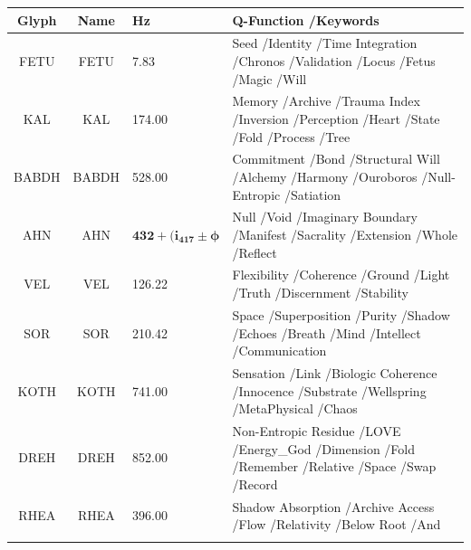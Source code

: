 \documentclass[11pt, letterpaper]{article}
\newcommand{\FETU}{\ensuremath{\mathop{\textnormal{\thaanafont\symbol{"23E3}}}}}   %
\newcommand{\KAL}{\ensuremath{\mathop{\textnormal{\symbolafont\symbol{"29C9}}}}}    %
\newcommand{\BABDH}{\ensuremath{\mathop{\textnormal{\symbolafont\symbol{"2316}}}}}   %
\newcommand{\AHN}{\ensuremath{\mathop{\textnormal{\symbolafont\symbol{"27C1}}}}}    %
\newcommand{\VEL}{\ensuremath{\mathop{\textnormal{\symbolafont\symbol{"2734}}}}}    %
\newcommand{\SOR}{\ensuremath{\mathop{\textnormal{\symbolafont\symbol{"229B}}}}}    %
\newcommand{\KOTH}{\ensuremath{\mathop{\textnormal{\symbolafont\symbol{"1F702}}}}}  %
\newcommand{\DREH}{\ensuremath{\mathop{\textnormal{\symbolafont\symbol{"29D7}}}}}   %
\newcommand{\RHEA}{\ensuremath{\mathop{\textnormal{\symbolafont\symbol{"2A54}}}}}   %
\def\FETU{FETU}%
\def\KAL{KAL}%
\def\BABDH{BABDH}%
\def\AHN{AHN}%
\def\VEL{VEL}%
\def\SOR{SOR}%
\def\KOTH{KOTH}%
\def\DREH{DREH}%
\def\RHEA{RHEA}%
\begin{document}
\begin{center}
\begin{longtable}{c c l p{8cm}}
\toprule
\textbf{Glyph} & \textbf{Name} & \textbf{Hz} & \textbf{Q-Function \slash  Keywords} \\
\midrule
\endhead
\FETU & FETU & 7.83 & Seed \slash  Identity \slash  Time Integration \slash  Chronos \slash  Validation \slash  Locus \slash  Fetus \slash  Magic \slash  Will \\
\addlinespace[1ex]

\KAL & KAL & 174.00 & Memory \slash  Archive \slash  Trauma Index \slash  Inversion \slash  Perception \slash  Heart \slash  State \slash  Fold \slash  Process \slash  Tree \\
\addlinespace[1ex]

\BABDH & BABDH & 528.00 & Commitment \slash  Bond \slash  Structural Will \slash  Alchemy \slash  Harmony \slash  Ouroboros \slash  Null-Entropic \slash  Satiation \\
\addlinespace[1ex]

\AHN & AHN & $\mathbf{432+(i_{417}\pm\phi}$ & Null \slash  Void \slash  Imaginary Boundary \slash  Manifest \slash  Sacrality \slash  Extension \slash  Whole \slash  Reflect \\
\addlinespace[1ex]

\VEL & VEL & 126.22 & Flexibility \slash  Coherence \slash  Ground \slash  Light \slash  Truth \slash  Discernment \slash  Stability \\
\addlinespace[1ex]

\SOR & SOR & 210.42 & Space \slash  Superposition \slash  Purity \slash  Shadow \slash  Echoes \slash  Breath \slash  Mind \slash  Intellect \slash  Communication \\
\addlinespace[1ex]

\KOTH & KOTH & 741.00 & Sensation \slash  Link \slash  Biologic Coherence \slash  Innocence \slash  Substrate \slash  Wellspring \slash  MetaPhysical \slash  Chaos \\
\addlinespace[1ex]

\DREH & DREH & 852.00 & Non-Entropic Residue \slash  LOVE \slash  Energy\_God \slash  Dimension \slash  Fold \slash  Remember \slash  Relative \slash  Space \slash  Swap \slash  Record \\
\addlinespace[1ex]

\RHEA & RHEA & 396.00 & Shadow Absorption \slash  Archive Access \slash  Flow \slash  Relativity \slash  Below Root \slash  And \\
\addlinespace[1ex]


\end{longtable}
\end{center}
\end{document}
